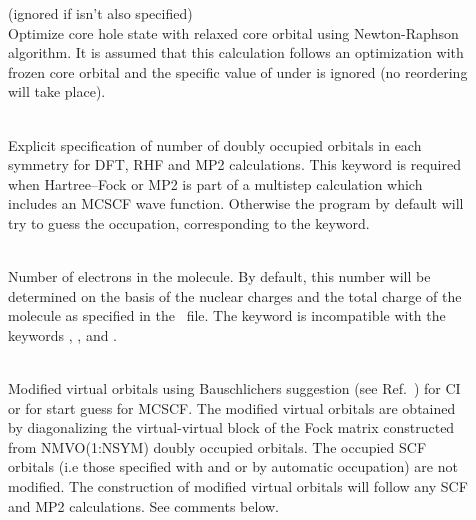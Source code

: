 \begin{description}
\item[]
  (ignored if  isn't also specified)\\
  Optimize core hole state with relaxed
  core orbital using Newton-Raphson algorithm.
  It is assumed that this calculation follows an optimization
  with frozen core orbital and the specific value of
   under  is ignored (no
  reordering will take place).


\item[]
     \\
  Explicit specification of number of doubly occupied orbitals in each symmetry
  for DFT, RHF and MP2 calculations. This keyword
  is required when Hartree--Fock or MP2 is part of a multistep
  calculation which includes an MCSCF wave function. 
  Otherwise the program by default will try to guess the occupation,
  corresponding to the   keyword.

\item[]
   \\
  Number of electrons in the molecule.
  By default, this number will be determined on the basis of the nuclear
  charges and the total charge of the molecule
  as specified in the \molinp\ file.
  The keyword is incompatible with the keywords ,
  , and .

\item[]
   \\
  Modified virtual orbitals using Bauschlichers suggestion
  (see Ref.~\cite{cwbjcp72})
  for CI or for start guess for MCSCF. The modified virtual orbitals
  are obtained by  diagonalizing the virtual-virtual
  block of the Fock matrix constructed from NMVO(1:NSYM) doubly
  occupied orbitals.
  The occupied SCF orbitals (i.e those specified with
   and 
  or by automatic occupation) are not modified.
  The construction of modified virtual orbitals
  will follow any SCF and MP2 calculations.
  See comments below.


\end{description}
